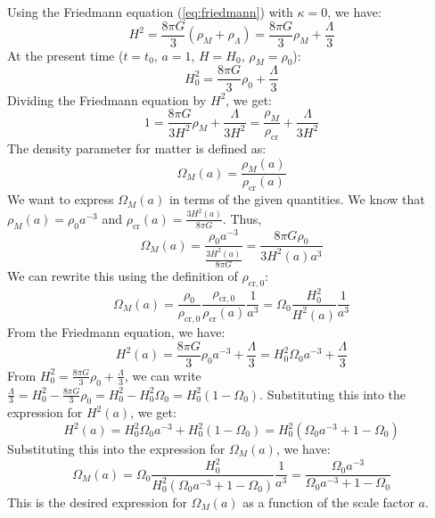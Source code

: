 \documentclass{article}
\begin{document}
Using the Friedmann equation (\ref{eq:friedmann}) with $\kappa = 0$, we have:
\begin{equation}
H^2 = \frac{8\pi G}{3}(\rho_M + \rho_\Lambda) = \frac{8\pi G}{3} \rho_M + \frac{\Lambda}{3}
\end{equation}
At the present time ($t=t_0$, $a=1$, $H=H_0$, $\rho_M = \rho_0$):
\begin{equation}
H_0^2 = \frac{8\pi G}{3} \rho_0 + \frac{\Lambda}{3}
\end{equation}
Dividing the Friedmann equation by $H^2$, we get:
\begin{equation}
1 = \frac{8\pi G}{3H^2} \rho_M + \frac{\Lambda}{3H^2} = \frac{\rho_M}{\rho_{\text{cr}}} + \frac{\Lambda}{3H^2}
\end{equation}
The density parameter for matter is defined as:
\begin{equation}
\Omega_M(a) = \frac{\rho_M(a)}{\rho_{\text{cr}}(a)}
\end{equation}
We want to express $\Omega_M(a)$ in terms of the given quantities. We know that $\rho_M(a) = \rho_0 a^{-3}$ and $\rho_{\text{cr}}(a) = \frac{3H^2(a)}{8\pi G}$. Thus,
\begin{equation}
\Omega_M(a) = \frac{\rho_0 a^{-3}}{\frac{3H^2(a)}{8\pi G}} = \frac{8\pi G \rho_0}{3 H^2(a) a^3}
\end{equation}
We can rewrite this using the definition of $\rho_{\text{cr},0}$:
\begin{equation}
\Omega_M(a) = \frac{\rho_0}{\rho_{\text{cr},0}} \frac{\rho_{\text{cr},0}}{\rho_{\text{cr}}(a)} \frac{1}{a^3} = \Omega_0 \frac{H_0^2}{H^2(a)} \frac{1}{a^3}
\end{equation}
From the Friedmann equation, we have:
\begin{equation}
H^2(a) = \frac{8\pi G}{3} \rho_0 a^{-3} + \frac{\Lambda}{3} = H_0^2 \Omega_0 a^{-3} + \frac{\Lambda}{3}
\end{equation}
From $H_0^2 = \frac{8\pi G}{3} \rho_0 + \frac{\Lambda}{3}$, we can write $\frac{\Lambda}{3} = H_0^2 - \frac{8\pi G}{3} \rho_0 = H_0^2 - H_0^2 \Omega_0 = H_0^2(1-\Omega_0)$. Substituting this into the expression for $H^2(a)$, we get:
\begin{equation}
H^2(a) = H_0^2 \Omega_0 a^{-3} + H_0^2(1-\Omega_0) = H_0^2 \left( \Omega_0 a^{-3} + 1 - \Omega_0 \right)
\end{equation}
Substituting this into the expression for $\Omega_M(a)$, we have:
\begin{equation}\label{eq:Omega_M}
\Omega_M(a) = \Omega_0 \frac{H_0^2}{H_0^2 \left( \Omega_0 a^{-3} + 1 - \Omega_0 \right)} \frac{1}{a^3} = \frac{\Omega_0 a^{-3}}{\Omega_0 a^{-3} + 1 - \Omega_0}
\end{equation}
This is the desired expression for $\Omega_M(a)$ as a function of the scale factor $a$.
\end{document}
